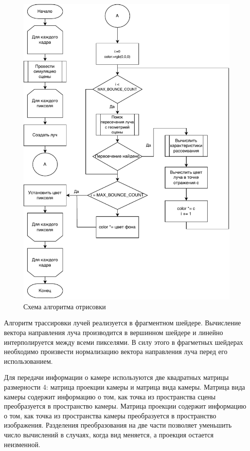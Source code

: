 \begin{figure}[H]
	\centering
	\includegraphics[width=120mm]{inc/pdf/app_algo}
	\caption{Схема алгоритма отрисовки}
	\label{img:app_algo}
\end{figure}


Алгоритм трассировки лучей реализуется в фрагментном шейдере.
Вычисление вектора направления луча производится в вершинном
шейдере и линейно интерполируется между всеми пикселями. В силу этого 
в фрагметных шейдерах необходимо произвести нормализацию вектора направления луча
перед его использованием.

Для передачи информации о камере используются две квадратных матрицы размерности 4: матрица проекции камеры и матрица вида камеры. Матрица вида камеры содержит информацию о том, 
как точка из пространства сцены преобразуется в пространство камеры. Матрица проекции 
содержит информацию о том, как точка из пространства камеры преобразуется в пространство 
изображения. Разделения преобразования на две части позволяет уменьшить число вычислений 
в случаях, когда вид меняется, а проекция остается неизменной.

